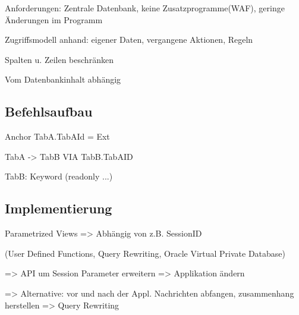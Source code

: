 Anforderungen: Zentrale Datenbank, keine Zusatzprogramme(WAF), geringe Änderungen im Programm

Zugriffsmodell anhand: eigener Daten, vergangene Aktionen, Regeln

Spalten u. Zeilen beschränken

Vom Datenbankinhalt abhängig



\subsection*{Befehlsaufbau}
Anchor TabA.TabAId = Ext

TabA -> TabB VIA TabB.TabAID 

TabB: Keyword (readonly ...)


\subsection*{Implementierung}

Parametrized Views => Abhängig von z.B. SessionID

(User Defined Functions, Query Rewriting, Oracle Virtual Private Database)

=> API um Session Parameter erweitern => Applikation ändern

=> Alternative: vor und nach der Appl. Nachrichten abfangen, zusammenhang herstellen => Query Rewriting
